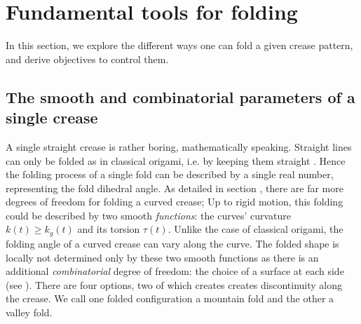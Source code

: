 \section{Fundamental tools for folding} \label{sec:folding}
In this section, we explore the different ways one can fold a given crease pattern, and derive objectives to control them.

\subsection{The smooth and combinatorial parameters of a single crease}
A single straight crease is rather boring, mathematically speaking. Straight lines can only be folded as in classical origami, i.e. by keeping them straight \cite{demaine_lens}. Hence the folding process of a single fold can be described by a single real number, representing the fold dihedral angle. As detailed in section , there are far more degrees of freedom for folding a curved crease; Up to rigid motion, this folding could be described by two smooth \textit{functions}: the curves' curvature $k(t) \geq k_g(t)$ and its torsion $\tau(t)$. Unlike the case of classical origami, the folding angle of a curved crease can vary along the curve. The folded shape is locally not determined only by these two smooth functions as there is an additional \textit{combinatorial} degree of freedom: the choice of a surface at each side (see ). There are four options, two of which creates creates discontinuity along the crease. We call one folded configuration a mountain fold and the other a valley fold. %



